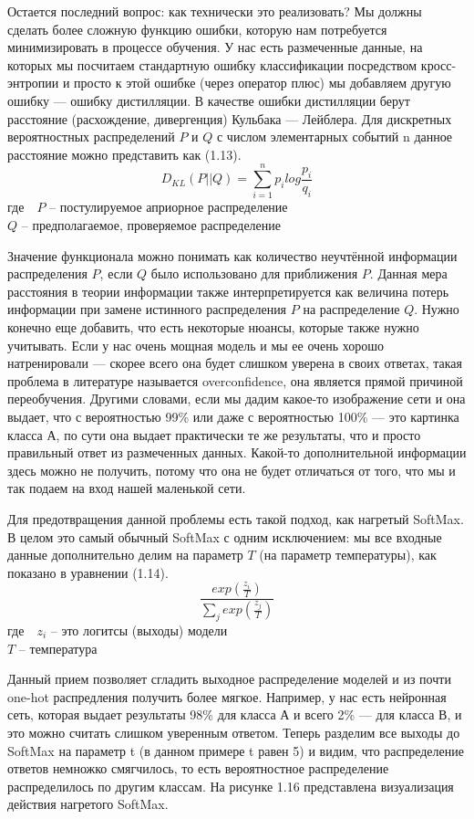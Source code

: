 \documentclass[oneside,final,12pt]{extreport}
\begin{document}
Остается последний вопрос: как технически это реализовать? Мы должны сделать более сложную функцию ошибки, которую нам потребуется минимизировать в процессе обучения. У нас есть размеченные данные, на которых мы посчитаем стандартную ошибку классификации посредством кросс-энтропии и просто к этой ошибке (через оператор плюс) мы добавляем другую ошибку — ошибку дистилляции. В качестве ошибки дистилляции берут расстояние (расхождение, дивергенция) Кульбака — Лейблера. Для дискретных вероятностных распределений $P$ и $Q$ с числом элементарных событий n данное расстояние можно представить как (1.13).
\begin{equation}
D_{KL}(P||Q)=\sum_{i=1}^{n}p_ilog\frac{p_i}{q_i}
\end{equation}
где\ \ $P$ – постулируемое априорное распределение\\
$Q$ – предполагаемое, проверяемое распределение

Значение функционала можно понимать как количество неучтённой информации распределения $P$, если $Q$ было использовано для приближения $P$. Данная мера расстояния в теории информации также интерпретируется как величина потерь информации при замене истинного распределения $P$ на распределение $Q$.
Нужно конечно еще добавить, что есть некоторые нюансы, которые также нужно учитывать. Если у нас очень мощная модель и мы ее очень хорошо натренировали — скорее всего она будет слишком уверена в своих ответах, такая проблема в литературе называется overconfidence, она является прямой причиной переобучения. Другими словами, если  мы дадим какое-то изображение сети и она выдает, что с вероятностью 99\% или даже с вероятностью 100\% — это картинка класса А, по сути она выдает практически те же результаты, что и просто правильный ответ из размеченных данных. Какой-то дополнительной информации здесь можно не получить, потому что она не будет отличаться от того, что мы и так подаем на вход нашей маленькой сети. 

Для предотвращения данной проблемы есть такой подход, как нагретый SoftMax. В целом это самый обычный SoftMax с одним исключением: мы все входные данные дополнительно делим на параметр $T$ (на параметр температуры), как показано в уравнении (1.14).
\begin{equation}
\frac{exp(\frac{z_i}{T})}{\sum_{j}^{}exp(\frac{z_j}{T})}
\end{equation}
где\ \ $z_i$ – это логитсы (выходы) модели\\
$T$ – температура

Данный прием позволяет сгладить выходное распределение моделей и из почти one-hot  распредления получить более мягкое. Например, у нас есть нейронная сеть, которая выдает результаты 98\% для класса А и всего 2\% — для класса В, и это можно считать слишком уверенным ответом. Теперь разделим все выходы до SoftMax на параметр t (в данном примере t равен 5) и видим, что  распределение ответов немножко смягчилось, то есть вероятностное распределение распределилось по другим классам. На рисунке 1.16 представлена визуализация действия нагретого SoftMax.
\end{document}
